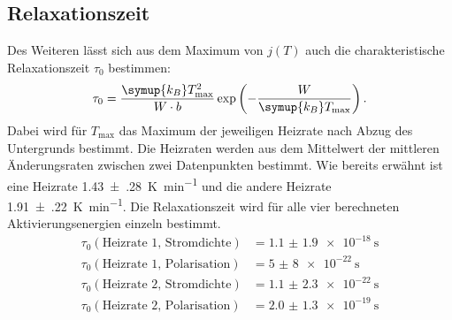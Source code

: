 \subsection{Relaxationszeit}
\label{sec:relax}
Des Weiteren lässt sich aus dem Maximum von $j(T)$ auch die charakteristische Relaxationszeit $\tau_0$
bestimmen:
\begin{equation}
    \label{eqn:tau0}
    \tau_0 = \frac{\symup{k_B}T_\text{max}^2}{W \cdot b} \exp\left(-\frac{W}{\symup{k_B}T_\text{max}} \right).
\end{equation}
Dabei wird für $T_\text{max}$ das Maximum der jeweiligen Heizrate nach Abzug des Untergrunds bestimmt.
Die Heizraten werden aus dem Mittelwert der mittleren Änderungsraten zwischen zwei Datenpunkten bestimmt.
Wie bereits erwähnt ist eine Heizrate \SI{1.43(28)}{\kelvin\per\minute} und die andere Heizrate \SI{1.91(22)}{\kelvin\per\minute}.
Die Relaxationszeit wird für alle vier berechneten Aktivierungsenergien einzeln bestimmt.
\begin{align*}
  \tau_0(\text{Heizrate 1, Stromdichte}) &= \SI{1.1(19)e-18}{\second} \\
  \tau_0(\text{Heizrate 1, Polarisation}) &= \SI{5(8)e-22}{\second} \\
  \tau_0(\text{Heizrate 2, Stromdichte}) &= \SI{1.1(23)e-22}{\second} \\
  \tau_0(\text{Heizrate 2, Polarisation}) &= \SI{2.0(13)e-19}{\second} \\
\end{align*}
